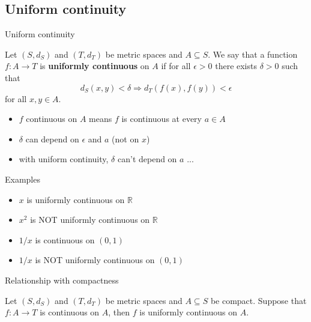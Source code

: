 \documentclass{beamer}
\begin{document}
\subsection{Uniform continuity}

\begin{frame}{Uniform continuity}
\begin{defn}
Let $(S,d_S)$ and $(T,d_T)$ be metric spaces and $A\subseteq S$.
We say that a function $f: A\rightarrow T$ is \textbf{uniformly continuous} on $A$ if for all $\epsilon > 0$ there exists $\delta > 0$ such that
$$d_S(x,y)< \delta \Rightarrow d_T(f(x),f(y))< \epsilon$$
for all $x,y\in A$.
\end{defn}
\begin{itemize}
\item $f$ continuous on $A$ means $f$ is continuous at every $a\in A$
\item $\delta$ can depend on $\epsilon$ and $a$ (not on $x$)
\item with uniform continuity, $\delta$ can't depend on $a$ ...
\end{itemize}
\end{frame}

\begin{frame}{Examples}
\begin{itemize}
\item $x$ is uniformly continuous on $\mathbb R$
\item $x^2$ is NOT uniformly continuous on $\mathbb R$
\item $1/x$ is continuous on $(0,1)$
\item $1/x$ is NOT uniformly continuous on $(0,1)$
\end{itemize}
\end{frame}

\begin{frame}{Relationship with compactness}

\begin{thm}[Heine]
Let $(S,d_S)$ and $(T,d_T)$ be metric spaces and $A\subseteq S$ be compact.
Suppose that $f: A\rightarrow T$ is continuous on $A$, then $f$ is uniformly continuous on $A$.
\end{thm}
\end{frame}
\end{document}
